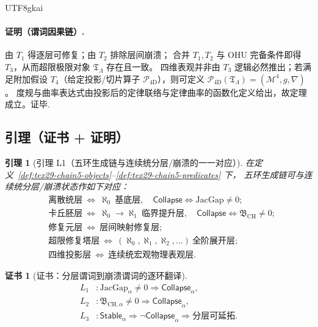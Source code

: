 \documentclass[12pt]{article}
\newtheorem{lemma}{引理}[section]
\newtheorem{Certificate}{证书}[section]
\begin{document}
\begin{CJK*}{UTF8}{gkai}
\paragraph{证明（谓词因果链）.}
由 $T_1$ 得逐层可修复；由 $T_2$ 排除层间崩溃；
合并 $T_1,T_2$ 与 OHU 完备条件即得 $T_3$，从而超限极限对象 $\mathfrak{T}_{\Lambda}$ 存在且一致。
四维表观并非由 $T_3$ 逻辑必然推出；若满足附加假设 $T_4$（给定投影/切片算子 $\mathcal{P}_{\mathrm{4D}}$），则可定义
$\mathcal{P}_{\mathrm{4D}}(\mathfrak{T}_{\Lambda})=(\mathcal{M}^{4},g,\nabla)$。
度规与曲率表达式由投影后的定律联络与定律曲率的函数化定义给出，故定理成立。证毕.

\subsection{引理（证书 + 证明）}
\label{subsec:tex29-chain-discrete-kqemb-tower-4d-lemma}

\begin{lemma}[引理 L1（五环生成链与连续统分层/崩溃的一一对应）]
\label{lem:tex29-chain5-layer-collapse}
在定义~\ref{def:tex29-chain5-objects}--\ref{def:tex29-chain5-predicates} 下，
五环生成链可与连续统分层/崩溃状态作如下对应：
\[
\begin{aligned}
  &\text{离散统层}\ \Longleftrightarrow\ \aleph_0\ \text{基底层},\quad
  \mathsf{Collapse}\Longleftrightarrow \mathrm{JacGap}\neq 0;\\
  &\text{卡丘胚层}\ \Longleftrightarrow\ \aleph_0\to\aleph_1\ \text{临界提升层},\quad
  \mathsf{Collapse}\Longleftrightarrow \mathfrak{B}_{\mathrm{CH}}\neq 0;\\
  &\text{修复元层}\ \Longleftrightarrow\ \text{层间映射修复层};\\
  &\text{超限修复塔层}\ \Longleftrightarrow\ (\aleph_0,\aleph_1,\aleph_2,\dots)\ \text{全阶展开层};\\
  &\text{四维投影层}\ \Longleftrightarrow\ \text{连续统宏观物理表观层}.
\end{aligned}
\]
\end{lemma}

\begin{Certificate}[证书：分层谓词到崩溃谓词的逐环翻译]
\label{cert:tex29-chain5-layer-collapse}
\[
\begin{aligned}
  L_1 &: \mathrm{JacGap}_{\alpha}\neq 0\Rightarrow \mathsf{Collapse}_{\alpha},\\
  L_2 &: \mathfrak{B}_{\mathrm{CH},\alpha}\neq 0\Rightarrow \mathsf{Collapse}_{\alpha},\\
  L_3 &: \mathsf{Stable}_{\alpha}\Rightarrow \neg\mathsf{Collapse}_{\alpha}\Rightarrow \text{分层可延拓}.
\end{aligned}
\]
\end{Certificate}


\end{CJK*}
\end{document}
